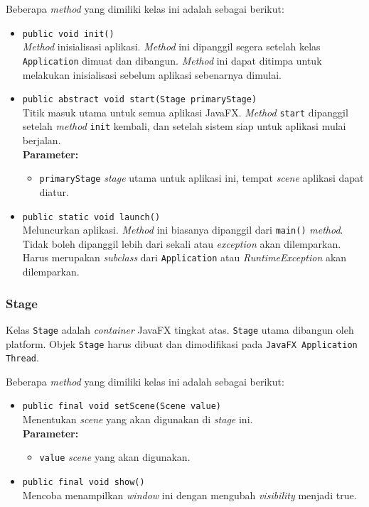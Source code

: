 Beberapa \textit{method} yang dimiliki kelas ini adalah sebagai berikut:
\begin{itemize}
	\item \texttt{public void init()}\\
	\textit{Method} inisialisasi aplikasi. \textit{Method} ini dipanggil segera setelah kelas \texttt{Application} dimuat dan dibangun. \textit{Method} ini dapat ditimpa untuk melakukan inisialisasi sebelum aplikasi sebenarnya dimulai.
	
	\item \texttt{public abstract void start(Stage primaryStage)}\\
	Titik masuk utama untuk semua aplikasi JavaFX. \textit{Method} \texttt{start} dipanggil setelah \textit{method} \texttt{init} kembali, dan setelah sistem siap untuk aplikasi mulai berjalan.\\
	\textbf{Parameter:}
	\begin{itemize}
		\item \texttt{primaryStage} \textit{stage} utama untuk aplikasi ini, tempat \textit{scene} aplikasi dapat diatur.
	\end{itemize}
	
	\item \texttt{public static void launch()}\\
    Meluncurkan aplikasi. \textit{Method} ini biasanya dipanggil dari \texttt{main()} \textit{method}. Tidak boleh dipanggil lebih dari sekali atau \textit{exception} akan dilemparkan. Harus merupakan \textit{subclass} dari \texttt{Application} atau \textit{RuntimeException} akan dilemparkan.\\
\end{itemize}


\subsubsection{Stage}
Kelas \texttt{Stage} adalah \textit{container} JavaFX tingkat atas. \texttt{Stage} utama dibangun oleh platform. Objek \texttt{Stage} harus dibuat dan dimodifikasi pada \texttt{JavaFX Application Thread}.

Beberapa \textit{method} yang dimiliki kelas ini adalah sebagai berikut:
\begin{itemize}
	\item \texttt{public final void setScene(Scene value)}\\
	Menentukan \textit{scene} yang akan digunakan di \textit{stage} ini.\\
	\textbf{Parameter:}
	\begin{itemize}
		\item \texttt{value} \textit{scene} yang akan digunakan.
	\end{itemize}
	
	\item \texttt{public final void show()}\\
	Mencoba menampilkan \textit{window} ini dengan mengubah \textit{visibility} menjadi true.
\end{itemize}


